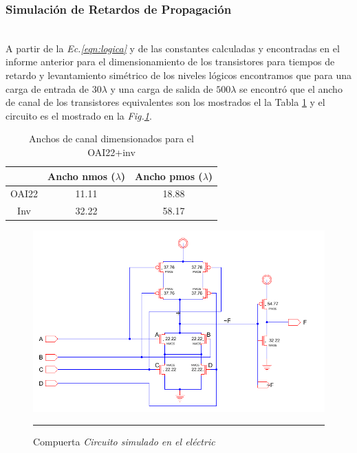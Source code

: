 \documentclass[12pt,a4paper]{article} %
\begin{document}
\subsubsection{Simulación de Retardos de Propagación}\\

A partir de la \textit{Ec.\ref{eqn:logica}} y de las constantes calculadas y encontradas en el informe anterior para el dimensionamiento de los transistores para tiempos de retardo y levantamiento simétrico de los niveles lógicos encontramos que para una carga de entrada de $30\lambda$ y una carga de salida de $500\lambda$ se encontró que el ancho de canal de los transistores equivalentes son los mostrados el la Tabla \ref{table:ancho_canal} y el circuito es el mostrado en la \textit{Fig.\ref{fig:circuito_E}}.\\


\begin{table}\label{table:ancho_canal}
\begin{center}
\begin{tabular}{c||c||c}
  & Ancho nmos ($\lambda$) & Ancho pmos ($\lambda$)\\
\hline
\hline
OAI22 & 11.11 & 18.88 \\
Inv & 32.22 & 58.17 \\
\hline
\end{tabular}
\caption{Anchos de canal dimensionados para el OAI22+inv}
\end{center}
\end{table}

\begin{figure}[htbp]
  \centering
    \includegraphics[scale=0.5]{./Cicuito_Electric.png}
    \rule{35em}{0.5pt}
  \caption[IdealvsSim]{Compuerta \textit{Circuito simulado en el eléctric}}
  \label{fig:circuito_E}
\end{figure}
\end{document}
